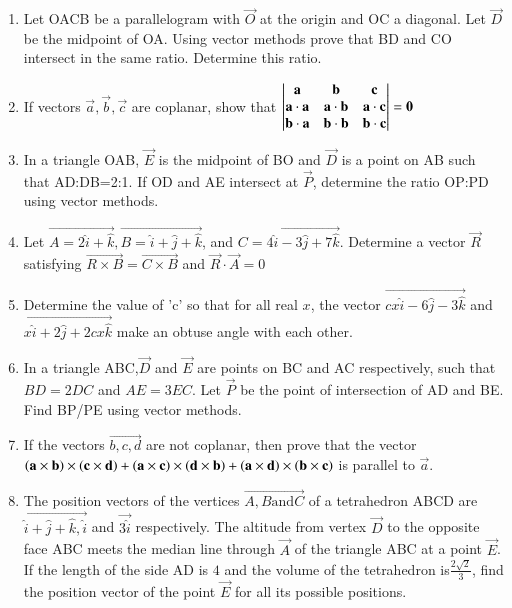 \documentclass[journal,12pt,twocolumn]{IEEEtran}
\theoremstyle{remark}
\begin{document}
\begin{enumerate}
	\item Let OACB be a parallelogram with $\vec{O}$ at the origin and OC a diagonal. Let $\vec{D}$ be the midpoint of OA. Using vector methods prove that BD and CO intersect in the same ratio. Determine this ratio. \hfill{}\\ 

\item If vectors $\vec{a},\vec{b},\vec{c}$ are coplanar, show that
	$
		\begin{vmatrix}
\mathbf{a} & \mathbf{b} & \mathbf{c} \\
\mathbf{a}\cdot\mathbf{a} & \mathbf{a}\cdot\mathbf{b} & \mathbf{a}\cdot\mathbf{c} \\
\mathbf{b}\cdot\mathbf{a} & \mathbf{b}\cdot\mathbf{b} & \mathbf{b}\cdot\mathbf{c}
 \end{vmatrix}=\mathbf{0}
		$ \hfill{}\\

	\item In a triangle OAB, $\vec{E}$ is the midpoint of BO and $\vec{D}$ is a point on AB such that AD:DB=2:1. If OD and AE intersect at $\vec{P}$, determine the ratio OP:PD  using vector methods. \hfill{}\\

	\item Let $\vec{A=2\hat{i}+\hat{k}},\vec{B=\hat{i}+\hat{j}+\hat{k}}$, and $\vec{C=4\hat{i}-3\hat{j}+7\hat{k}}$. Determine a vector $\vec{R}$ satisfying $\vec{R\times B}=\vec{C\times B}$ and $\vec{R}\cdot\vec{A}=0$ \hfill{}\\

	\item Determine the value of 'c' so that for all real $x$, the vector $\vec{cx\hat{i}-6\hat{j}-3\hat{k}}$ and $\vec{x\hat{i}+2\hat{j}+2cx\hat{k}}$ make an obtuse angle with each other. \hfill{}\\

	\item In a triangle ABC,$\vec{D}$ and $\vec{E}$ are points on BC and AC respectively, such that $BD=2DC$ and $AE=3EC$. Let $\vec{P}$ be the point of intersection of AD and BE. Find BP/PE using vector methods. \hfill{}\\

	\item If the vectors $\vec{b,c,d}$ are not coplanar, then prove that the vector $\mathbf{\left(a\times b\right)\times\left(c\times d\right)}+\mathbf{\left(a\times c\right)\times\left(d\times b\right)}+\mathbf{\left(a\times d\right)\times\left(b\times c\right)}$ is parallel to $\vec{a}$. \hfill{}\\

	\item The position vectors of the vertices $\vec{A,B \text{and} C}$ of a tetrahedron ABCD are $\vec{\hat{i}+\hat{j}+\hat{k},\hat{i}}$ and $\vec{3\hat{i}}$ respectively. The altitude from vertex $\vec{D}$ to the opposite face ABC meets the median line through $\vec{A}$ of the triangle ABC at a point $\vec{E}$. If the length of the side AD is $4$ and the volume of the tetrahedron is$\frac{2\sqrt{2}}{3}$, find the position vector of the point $\vec{E}$ for all its possible positions. \hfill{}


\end{enumerate}
\end{document}
